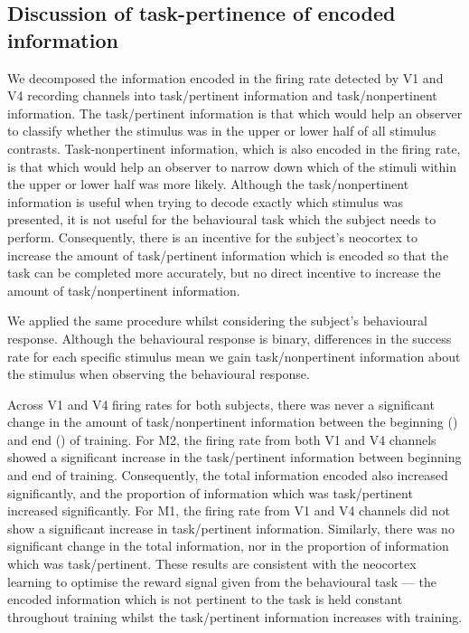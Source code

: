 \subsection{Discussion of task-pertinence of encoded information}

We decomposed the information encoded in the firing rate detected by \ac{V1} and \ac{V4} recording channels into task\-/pertinent information and task\-/nonpertinent information.
The task\-/pertinent information is that which would help an observer to classify whether the stimulus was in the upper or lower half of all stimulus contrasts.
Task-nonpertinent information, which is also encoded in the firing rate, is that which would help an observer to narrow down which of the stimuli within the upper or lower half was more likely.
Although the task\-/nonpertinent information is useful when trying to decode exactly which stimulus was presented, it is not useful for the behavioural task which the subject needs to perform.
Consequently, there is an incentive for the subject's neocortex to increase the amount of task\-/pertinent information which is encoded so that the task can be completed more accurately, but no direct incentive to increase the amount of task\-/nonpertinent information.

We applied the same procedure whilst considering the subject's behavioural response.
Although the behavioural response is binary, differences in the success rate for each specific stimulus mean we gain task\-/nonpertinent information about the stimulus when observing the behavioural response.

Across \ac{V1} and \ac{V4} firing rates for both subjects, there was never a significant change in the amount of task\-/nonpertinent information between the beginning () and end () of training.
For \ac{M2}, the firing rate from both \ac{V1} and \ac{V4} channels showed a significant increase in the task\-/pertinent information between beginning and end of training.
Consequently, the total information encoded also increased significantly, and the proportion of information which was task\-/pertinent increased significantly.
For \ac{M1}, the firing rate from \ac{V1} and \ac{V4} channels did not show a significant increase in task\-/pertinent information.
Similarly, there was no significant change in the total information, nor in the proportion of information which was task\-/pertinent.
These results are consistent with the neocortex learning to optimise the reward signal given from the behavioural task --- the encoded information which is not pertinent to the task is held constant throughout training whilst the task\-/pertinent information increases with training.

